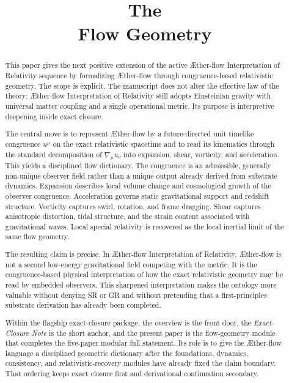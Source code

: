 \documentclass[11pt]{article}
\title{\textbf{The \TheoryName{}}\\[0.4em]
\large Flow Geometry}
\author{}
\date{}
\newcommand{\Aflow}{\AE{}ther-flow}
\newcommand{\TheoryName}{\Aflow{} Interpretation of Relativity}
\begin{document}
\maketitle

\begin{abstract}
This paper gives the next positive extension of the active \TheoryName{} sequence by formalizing \Aflow{} through congruence-based relativistic geometry. The scope is explicit. The manuscript does not alter the effective law of the theory: \TheoryName{} still adopts Einsteinian gravity with universal matter coupling and a single operational metric. Its purpose is interpretive deepening inside exact closure.

The central move is to represent \Aflow{} by a future-directed unit timelike congruence \(u^\mu\) on the exact relativistic spacetime and to read its kinematics through the standard decomposition of \(\nabla_\mu u_\nu\) into expansion, shear, vorticity, and acceleration. This yields a disciplined flow dictionary. The congruence is an admissible, generally non-unique observer field rather than a unique output already derived from substrate dynamics. Expansion describes local volume change and cosmological growth of the observer congruence. Acceleration governs static gravitational support and redshift structure. Vorticity captures swirl, rotation, and frame dragging. Shear captures anisotropic distortion, tidal structure, and the strain content associated with gravitational waves. Local special relativity is recovered as the local inertial limit of the same flow geometry.

The resulting claim is precise. In \TheoryName{}, \Aflow{} is not a second low-energy gravitational field competing with the metric. It is the congruence-based physical interpretation of how the exact relativistic geometry may be read by embedded observers. This sharpened interpretation makes the ontology more valuable without denying SR or GR and without pretending that a first-principles substrate derivation has already been completed.

Within the flagship exact-closure package, the overview is the front door, the \emph{Exact-Closure Note} is the short anchor, and the present paper is the flow-geometry module that completes the five-paper modular full statement. Its role is to give the \Aflow{} language a disciplined geometric dictionary after the foundations, dynamics, consistency, and relativistic-recovery modules have already fixed the claim boundary. That ordering keeps exact closure first and derivational continuation secondary.
\end{abstract}
\end{document}
